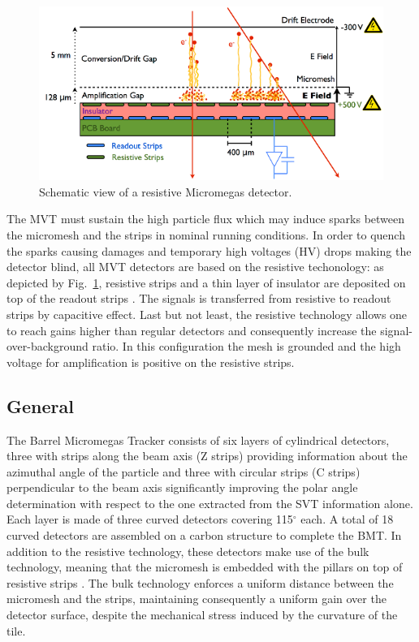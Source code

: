 \begin{figure}[htb]
 \includegraphics[width=1.0\columnwidth,keepaspectratio]{images/mm_principle}
 \caption{Schematic view of a resistive Micromegas detector.}
 \label{fig:mm-principle}
\end{figure}

The MVT must sustain the high particle flux which may induce sparks between the micromesh and the strips in nominal running conditions. In order to quench the sparks causing damages and temporary high voltages (HV) drops making the detector blind, all MVT detectors are based on the resistive techonology: as depicted by Fig.~\ref{fig:mm-principle}, resistive strips and a thin layer of insulator are deposited on top of the readout strips \cite{ALEXOPOULOS2011110}. The signals is transferred from resistive to readout strips by capacitive effect. Last but not least, the resistive technology allows one to reach gains higher than regular detectors and consequently increase the signal-over-background ratio. In this configuration the mesh is grounded and the high voltage for amplification is positive on the resistive strips. 

\subsection{General}

The Barrel Micromegas Tracker consists of six layers of cylindrical detectors, three with strips along the beam axis (Z strips) providing information about the azimuthal angle of the particle and three with circular strips (C strips) perpendicular to the beam axis significantly improving the polar angle determination with respect to the one extracted from the SVT information alone. Each layer is made of three curved detectors covering 115$^{\circ}$ each. A total of 18 curved detectors are assembled on a carbon structure to complete the BMT. In addition to the resistive technology, these detectors make use of the bulk technology, meaning that the micromesh is embedded with the pillars on top of resistive strips \cite{GIOMATARIS2006405}. The bulk technology enforces a uniform distance between the micromesh and the strips, maintaining consequently a uniform gain over the detector surface, despite the mechanical stress induced by the curvature of the tile.

